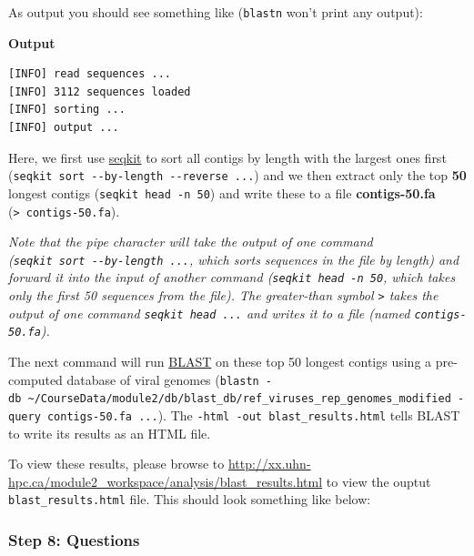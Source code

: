 \documentclass[
]{book}
\begin{document}
As output you should see something like (\texttt{blastn} won't print any output):

\textbf{Output}

\begin{verbatim}
[INFO] read sequences ...
[INFO] 3112 sequences loaded
[INFO] sorting ...
[INFO] output ...
\end{verbatim}

Here, we first use \href{https://bioinf.shenwei.me/seqkit/}{seqkit} to sort all contigs by length with the largest ones first (\texttt{seqkit\ sort\ -\/-by-length\ -\/-reverse\ ...}) and we then extract only the top \textbf{50} longest contigs (\texttt{seqkit\ head\ -n\ 50}) and write these to a file \textbf{contigs-50.fa} (\texttt{\textgreater{}\ contigs-50.fa}).

\emph{Note that the pipe \texttt{\textbar{}} character will take the output of one command (\texttt{seqkit\ sort\ -\/-by-length\ ...}, which sorts sequences in the file by length) and forward it into the input of another command (\texttt{seqkit\ head\ -n\ 50}, which takes only the first 50 sequences from the file). The greater-than symbol \texttt{\textgreater{}} takes the output of one command \texttt{seqkit\ head\ ...} and writes it to a file (named \texttt{contigs-50.fa}).}

The next command will run \href{https://blast.ncbi.nlm.nih.gov/Blast.cgi}{BLAST} on these top 50 longest contigs using a pre-computed database of viral genomes (\texttt{blastn\ -db\ \textasciitilde{}/CourseData/module2/db/blast\_db/ref\_viruses\_rep\_genomes\_modified\ -query\ contigs-50.fa\ ...}). The \texttt{-html\ -out\ blast\_results.html} tells BLAST to write its results as an HTML file.

To view these results, please browse to \url{http://xx.uhn-hpc.ca/module2_workspace/analysis/blast_results.html} to view the ouptut \texttt{blast\_results.html} file. This should look something like below:

\subsubsection{Step 8: Questions}\label{step-8-questions}
\end{document}
